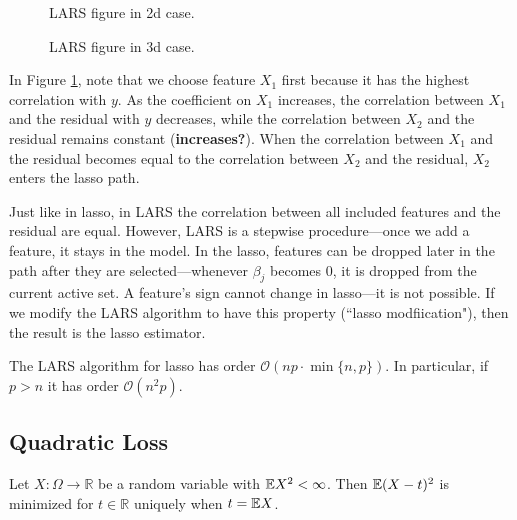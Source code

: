 \begin{figure}
\caption{\label{fig:lars_2d} LARS figure in 2d case.}
\end{figure}

\begin{figure}
\caption{\label{fig:lars_3d} LARS figure in 3d case.}
\end{figure}

In Figure \ref{fig:lars_2d}, note that we choose feature \(X_1\) first because it has the highest correlation with \(y\). As the coefficient on \(X_1\) increases, the correlation between \(X_1\) and the residual with \(y\) decreases, while the correlation between \(X_2\) and the residual remains constant (\textbf{increases?}). When the correlation between \(X_1\) and the residual becomes equal to the correlation between \(X_2\) and the residual, \(X_2\) enters the lasso path.

\begin{remark} Just like in lasso, in LARS the correlation between all included features and the residual are equal. However, LARS is a stepwise procedure---once we add a feature, it stays in the model. In the lasso, features can be dropped later in the path after they are selected---whenever \(\beta_j\) becomes 0, it is dropped from the current active set. A feature's sign cannot change in lasso---it is not possible. If we modify the LARS algorithm to have this property (``lasso modfiication"), then the result is the lasso estimator.

\end{remark}

The LARS algorithm for lasso has order \(\mathcal{O}(np \cdot \min \{n, p\})\). In particular, if \(p > n\) it has order \(\mathcal{O}(n^2p)\).


\subsection{Quadratic Loss}

\begin{theorem}\label{exercise6.5}
Let $X:\Omega\to\mathbb{R}$ be a random variable with $\E X^{2}<\infty$. Then $\E(X-t)^{2}$ is minimized for $t\in\mathbb{R}$ uniquely when $t=\E X$.
\end{theorem}

